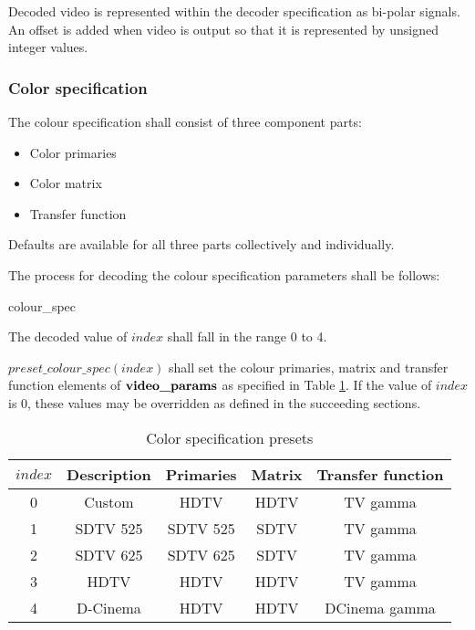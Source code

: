\begin{informative}
Decoded video is represented within the decoder specification as bi-polar 
signals. An offset is added when video is output so that it is represented by unsigned 
integer values.
\end{informative}

\subsubsection{Color specification}
\label{colourspec}

The colour specification shall consist of three component parts:
\begin{itemize}
\item Color primaries
\item Color matrix 
\item Transfer function
\end{itemize}

Defaults are available for all three parts collectively and individually.

The process for decoding the colour specification parameters shall be follows: 

\begin{pseudo}{colour\_spec}{\VideoParams}
    \bsEND
\bsEND
\end{pseudo}

The decoded value of $index$ shall fall in the range 0 to 4.

$preset\_colour\_spec(index)$ shall set the colour primaries, matrix and transfer function elements of $\textbf{video\_params}$ as specified 
in Table \ref{table:colourspecvalues}. If the value of $index$ is 0, these values may be overridden as defined in the succeeding sections. 

\begin{table}[!ht]
\centering
\begin{tabular}{|c|c|c|c|c|}
\hline
\rowcolor[gray]{0.75}$index$ & {\bf Description}& {\bf Primaries} & {\bf Matrix}& {\bf Transfer function}\\
\hline
0 & Custom & HDTV & HDTV & TV gamma \\ 
\hline
1 & SDTV 525 & SDTV 525 & SDTV & TV gamma \\
\hline
2 & SDTV 625 & SDTV 625 & SDTV & TV gamma \\
\hline
3 & HDTV & HDTV & HDTV & TV gamma \\
\hline
4 & D-Cinema & HDTV & HDTV & DCinema gamma\\
\hline
\end{tabular}
\caption{Color specification presets}\label{table:colourspecvalues}
\end{table}

